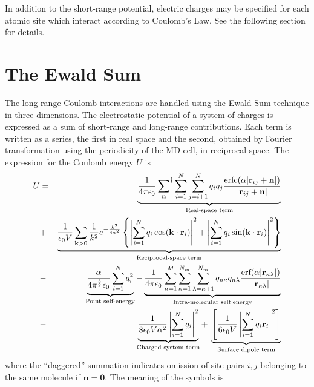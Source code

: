 \documentclass[a4paper,twoside]{report}
\providecommand{\bm}[1]{\mathbf{#1}}
\newcommand{\erf}{\mbox{erf}}
\newcommand{\erfc}{\mbox{erfc}}
\begin{document}
In addition to the short-range potential, electric charges may be
specified for each atomic site which interact according to Coulomb's
Law.  See the following section for details.

\section{The Ewald Sum}%
\label{sec:ewald}
The long range Coulomb interactions are handled using the Ewald Sum
technique in three dimensions\cite[p.\ 156]{berthaut:52,allen:87}.
The electrostatic potential of a system of charges is expressed as a
sum of short-range and long-range contributions.  Each term is written
as a series, the first in real space and the second, obtained by
Fourier transformation using the periodicity of the MD cell, in
reciprocal space.  The expression for the Coulomb energy $U$ is
\begin{eqnarray}
\label{eqn:ewald}
U & = &  \underbrace{\frac{1}{4 \pi \epsilon_0}
\sideset{}{^\dag}\sum_{\bm{n}} \sum_{i=1}^{N} \sum_{j=i+1}^{N} q_iq_j
\frac{\erfc( \alpha | \bm{r}_{ij} +  \bm{n} |)}{| \bm{r}_{ij} +
\bm{n} | }}_{\textnormal{Real-space term}} 
\nonumber \\
 & + & \underbrace{\frac{1}{\epsilon_0 V} \sum_{\bm{k} > 0} \frac{1}{k^2}
       e^{-\frac{k^2}{4 \alpha^2}} 
\left \lbrace 
\left | \sum_{i=1}^{N} q_i \cos(\bm{k \cdot r}_i) \right |^2 + 
\left | \sum_{i=1}^{N} q_i \sin(\bm{k \cdot r}_i) \right |^2 
\right \rbrace}_{\textnormal{Reciprocal-space term}}\\
 & - & 
\underbrace{\frac{\alpha}{4 \pi^\frac{3}{2} \epsilon_0} 
\sum_{i=1}^{N} q_i^2}_{\textnormal{Point self-energy}} 
 - \underbrace{\frac{1}{4 \pi \epsilon_0} \sum_{n=1}^M
\sum_{\kappa=1}^{N_m} \sum_{\lambda=\kappa+1}^{N_m} q_{n\kappa} q_{n\lambda}
\frac{\erf( \alpha | \bm{r}_{\kappa\lambda} |)}{|
\bm{r}_{\kappa\lambda}| }}_{\textnormal{Intra-molecular self energy}}
\nonumber \\
& - & \underbrace{ \frac{1}{8 \epsilon_0 V \alpha^2}
                    \left | \sum_{i=1}^N q_i 
                    \right |^2}_{\textnormal{Charged system term}} +
\; \underbrace{\left [  \frac{1}{6 \epsilon_0 V} 
                    \left | \sum_{i=1}^N q_i \bm{r}_i 
                    \right |^2 \right ]}_{\textnormal{Surface dipole term}}
\nonumber
\end{eqnarray}
where the ``daggered'' summation indicates omission of site pairs $i,
j$ belonging to the same molecule if $\bm{n}=\bm{0}$.  The meaning of
the symbols is
\end{document}
